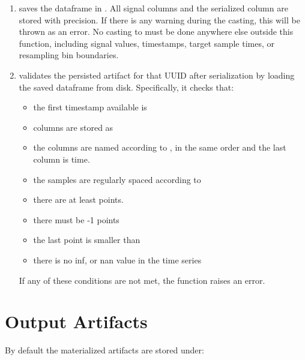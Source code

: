 \documentclass[11pt]{article}
\begin{document}
\begin{enumerate}
Note that since the raw Simulink Simulation do not start from 0, the first available sample is at time .
Additionally we cut the simulation to  with  excluded.
 is expected to have  as its first point and  points.

\item {} saves the dataframe in . 
All signal columns and the serialized  column are stored with  precision.
If there is any  warning during the casting, this will be thrown as an error.
No casting to  must be done anywhere else outside this function, including signal values, timestamps, target sample times, or resampling bin boundaries.


\item {} validates the persisted artifact for that UUID after serialization by loading the saved dataframe from disk. Specifically, it checks that:
  \begin{itemize}
  \item the first timestamp available is 
  \item columns are stored as 
  \item the columns are named according to , in the same order and the last column is time.
  \item the samples are regularly spaced according to 
  \item there are at least  points.
  \item there must be  -1 points
  \item the last point is smaller than 
  \item there is no inf, or nan value in the time series
  \end{itemize}

If any of these conditions are not met, the function raises an error.
\end{enumerate}
\section*{Output Artifacts}

By default the materialized artifacts are stored under:
\end{document}

